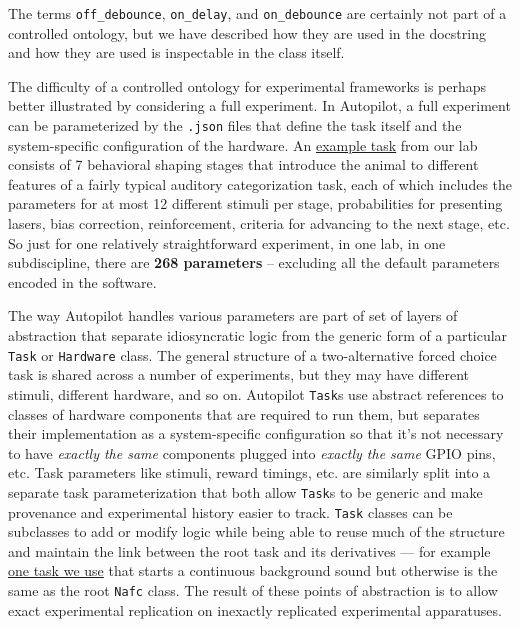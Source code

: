 \documentclass[notoc]{tufte-book}
\begin{document}
The terms \texttt{off\_debounce}, \texttt{on\_delay}, and
\texttt{on\_debounce} are certainly not part of a controlled ontology,
but we have described how they are used in the docstring and how they
are used is inspectable in the class itself.

The difficulty of a controlled ontology for experimental frameworks is
perhaps better illustrated by considering a full experiment. In
Autopilot, a full experiment can be parameterized by the \texttt{.json}
files that define the task itself and the system-specific configuration
of the hardware. An
\href{https://gist.github.com/sneakers-the-rat/eebe675326a157df49f66f62c4e33a6e}{example
task} from our lab consists of 7 behavioral shaping stages that
introduce the animal to different features of a fairly typical auditory
categorization task, each of which includes the parameters for at most
12 different stimuli per stage, probabilities for presenting lasers,
bias correction, reinforcement, criteria for advancing to the next
stage, etc. So just for one relatively straightforward experiment, in
one lab, in one subdiscipline, there are \textbf{268 parameters} --
excluding all the default parameters encoded in the software.

The way Autopilot handles various parameters are part of set of layers
of abstraction that separate idiosyncratic logic from the generic form
of a particular \texttt{Task} or \texttt{Hardware} class. The general
structure of a two-alternative forced choice task is shared across a
number of experiments, but they may have different stimuli, different
hardware, and so on. Autopilot \texttt{Task}s use abstract references to
classes of hardware components that are required to run them, but
separates their implementation as a system-specific configuration so
that it's not necessary to have \emph{exactly the same} components
plugged into \emph{exactly the same} GPIO pins, etc. Task parameters
like stimuli, reward timings, etc. are similarly split into a separate
task parameterization that both allow \texttt{Task}s to be generic and
make provenance and experimental history easier to track. \texttt{Task}
classes can be subclasses to add or modify logic while being able to
reuse much of the structure and maintain the link between the root task
and its derivatives --- for example
\href{https://github.com/auto-pi-lot/autopilot-plugin-wehrlab/blob/9cfffcf5fe1886d25658d4f1f0c0ffe41c18e2cc/gap/nafc_gap.py\#L13-L49}{one
task we use} that starts a continuous background sound but otherwise is
the same as the root \texttt{Nafc} class. The result of these points of
abstraction is to allow exact experimental replication on inexactly
replicated experimental apparatuses.
\end{document}
